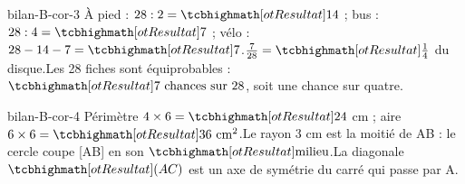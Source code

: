 \begin{blocEdition}{bilan-B-cor-3}
À pied : $28:2=\res{14}$ ; bus : $28:4=\res7$ ; vélo : $28-14-7=\res7$.$\frac7{28}=\res{\frac14}$ du disque.Les 28 fiches sont équiprobables : $\res{7\ \text{chances sur }28}$, soit une chance sur quatre.
\end{blocEdition}
\begin{blocEdition}{bilan-B-cor-4}
Périmètre $4\times6=\res{24}$ cm ; aire $6\times6=\res{36\ \mathrm{cm}^2}$.Le rayon 3 cm est la moitié de AB : le cercle coupe [AB] en son $\res{\text{milieu}}$.La diagonale $\res{(AC)}$ est un axe de symétrie du carré qui passe par A.
\end{blocEdition}
